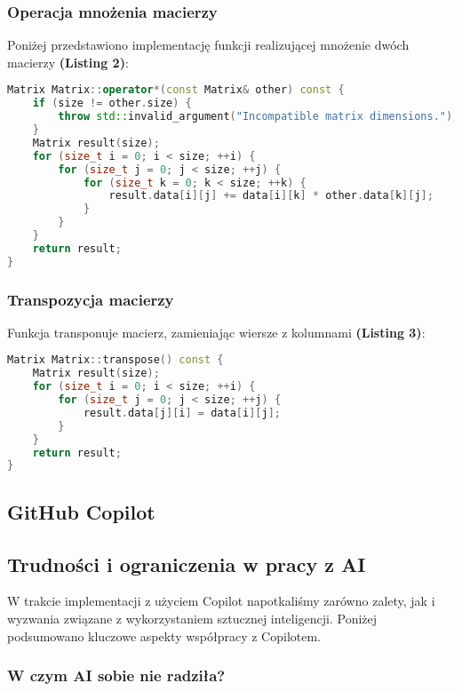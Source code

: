 \subsubsection{Operacja mnożenia macierzy}
Poniżej przedstawiono implementację funkcji realizującej mnożenie dwóch macierzy \textbf{(Listing 2)}:
\begin{lstlisting}[language=C++, caption={Implementacja funkcji \texttt{operator}}, label={lst:operator}]
Matrix Matrix::operator*(const Matrix& other) const {
    if (size != other.size) {
        throw std::invalid_argument("Incompatible matrix dimensions.");
    }
    Matrix result(size);
    for (size_t i = 0; i < size; ++i) {
        for (size_t j = 0; j < size; ++j) {
            for (size_t k = 0; k < size; ++k) {
                result.data[i][j] += data[i][k] * other.data[k][j];
            }
        }
    }
    return result;
}
\end{lstlisting}

\subsubsection{Transpozycja macierzy}
Funkcja transponuje macierz, zamieniając wiersze z kolumnami \textbf{(Listing 3)}:
\begin{lstlisting}[language=C++, caption={Implementacja fukncji \texttt{Transpose}}, label={lst:transpose}]
Matrix Matrix::transpose() const {
    Matrix result(size);
    for (size_t i = 0; i < size; ++i) {
        for (size_t j = 0; j < size; ++j) {
            result.data[j][i] = data[i][j];
        }
    }
    return result;
}
\end{lstlisting}

\newpage

\subsection{GitHub Copilot}

\subsection{Trudności i ograniczenia w pracy z AI}

W trakcie implementacji z użyciem Copilot napotkaliśmy zarówno zalety, jak i wyzwania związane z wykorzystaniem sztucznej inteligencji. Poniżej podsumowano kluczowe aspekty współpracy z Copilotem.

\subsubsection{W czym AI sobie nie radziła?}

